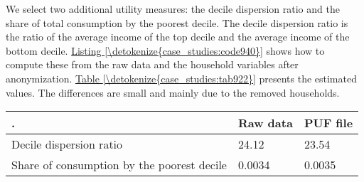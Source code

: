 \documentclass[letterpaper,10pt,english]{sphinxmanual}
\begin{document}
We select two additional utility measures: the decile dispersion ratio
and the share of total consumption by the poorest decile. The decile
dispersion ratio is the ratio of the average income of the top decile
and the average income of the bottom decile. \hyperref[\detokenize{case_studies:code940}]{Listing \ref{\detokenize{case_studies:code940}}} shows how to
compute these from the raw data and the household variables after
anonymization. \hyperref[\detokenize{case_studies:tab922}]{Table \ref{\detokenize{case_studies:tab922}}} presents the estimated values. The differences
are small and mainly due to the removed households.


\begin{savenotes}\sphinxattablestart
\centering
{}
\label{\detokenize{case_studies:tab922}}\label{\detokenize{case_studies:id37}}
\sphinxaftercaption
\begin{tabulary}{\linewidth}[t]{|T|T|T|}
\hline
\sphinxstyletheadfamily 
.
&\sphinxstyletheadfamily 
Raw data
&\sphinxstyletheadfamily 
PUF file
\\
\hline
Decile dispersion ratio
&
24.12
&
23.54
\\
\hline
Share of consumption by the poorest decile
&
0.0034
&
0.0035
\\
\hline
\end{tabulary}
\par
\sphinxattableend\end{savenotes}
\end{document}
